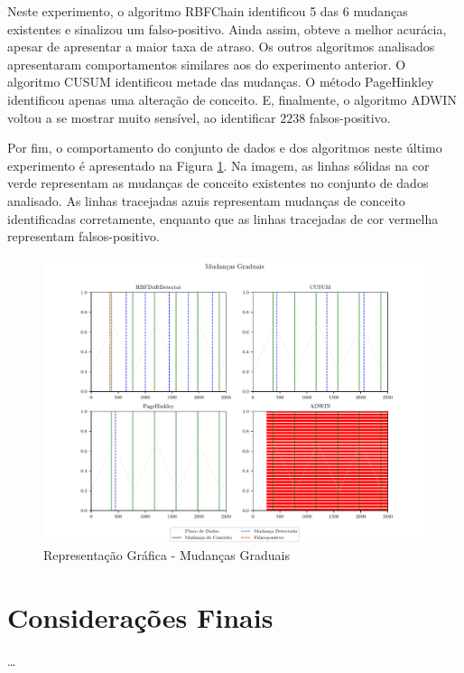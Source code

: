 \documentclass[msc, classic, a4paper]{ufbathesis}
\begin{document}
Neste experimento, o algoritmo RBFChain identificou 5 das 6 mudanças existentes e sinalizou um falso-positivo.
Ainda assim, obteve a melhor acurácia, apesar de apresentar a maior taxa de atraso.
Os outros algoritmos analisados apresentaram comportamentos similares aos do experimento anterior.
O algoritmo CUSUM identificou metade das mudanças.
O método PageHinkley identificou apenas uma alteração de conceito.
E, finalmente, o algoritmo ADWIN voltou a se mostrar muito sensível, ao identificar $2238$ falsos-positivo.

Por fim, o comportamento do conjunto de dados e dos algoritmos neste último experimento é apresentado na Figura \ref{fig:exp_gradual}.
Na imagem, as linhas sólidas na cor verde representam as mudanças de conceito existentes no conjunto de dados analisado. As linhas tracejadas azuis representam mudanças de conceito identificadas corretamente, enquanto que as linhas tracejadas de cor vermelha representam falsos-positivo.

\begin{figure}[ht]
\begin{center}
    \includegraphics[width=\textwidth]{imagens/gradual.pdf}
    \caption{Representação Gráfica - Mudanças Graduais}
    \label{fig:exp_gradual}
\end{center}
\end{figure}

\section{Considerações Finais}

\ldots
\end{document}
